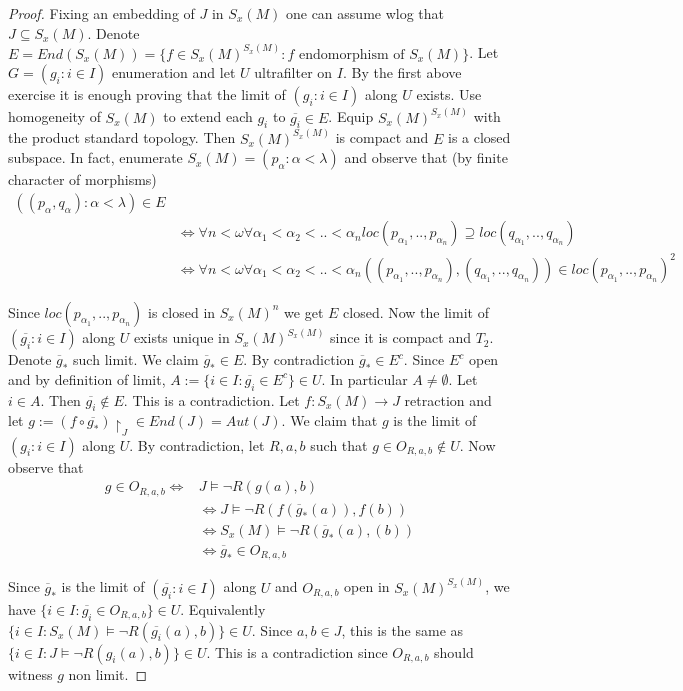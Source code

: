 \documentclass{article}
\begin{document}
\begin{proof}

	Fixing an embedding of $J$ in $S_x(M)$ one can assume wlog that $J \subseteq S_x(M)$.
	Denote $E = End(S_x(M)) = \{f \in S_x(M)^{S_x(M)}: f \text{ endomorphism of } S_x(M) \}$.
	Let $G = (g_i : i \in I)$ enumeration and let $U$ ultrafilter on $I$.
	By the first above exercise it is enough proving that the limit of $(g_i : i \in I)$ along $U$ exists.
	Use homogeneity of $S_x(M)$ to extend each $g_i$ to $\overline{g_i} \in E$.
	Equip $S_x(M) ^{S_x(M)}$ with the product standard topology.
	Then $S_x(M)^{S_x(M)}$ is compact and $E$ is a closed subspace. 
	In fact, enumerate $S_x(M) = (p_{\alpha}: \alpha < \lambda)$ and observe that (by finite character of morphisms)
	\begin{align*}
		((p_{\alpha},q_{\alpha}): \alpha < \lambda) \in E \\ 
		& \iff \forall n < \omega \forall \alpha_1 < \alpha_2 < .. < \alpha_n loc(p_{\alpha_1},..,p_{\alpha_n}) \supseteq loc(q_{\alpha_1},..,q_{\alpha_n}) \\
		& \iff \forall n < \omega \forall \alpha_1 < \alpha_2 < .. < \alpha_n ((p_{\alpha_1},..,p_{\alpha_n}),(q_{\alpha_1},..,q_{\alpha_n})) \in loc(p_{\alpha_1},..,p_{\alpha_n})^2
	\end{align*}

	Since $loc(p_{\alpha_1},..,p_{\alpha_n})$ is closed in $S_x(M)^n$ we get $E$ closed.
	Now the limit of $(\overline{g_i} : i \in I)$ along $U$ exists unique in $S_x(M)^{S_x(M)}$ since it is compact and $T_2$.
	Denote $\overline{g}_*$ such limit. We claim $\overline{g}_* \in E$. By contradiction $\overline{g}_* \in E^c$. Since $E^c$ open and by definition of limit,
	$A:= \{i \in I : \overline{g_i} \in E^c\} \in U$. In particular $A \not = \emptyset $. Let $i \in A$. Then $\overline{g_i} \not \in E$. This is a contradiction.
	Let $f: S_x(M) \to J$ retraction and let $g:= (f \circ \overline{g_*}) \restriction_J \in End(J) = Aut(J)$.
	We claim that $g$ is the limit of $(g_i : i \in I)$ along $U$.
	By contradiction, let $R,a,b$ such that $g \in O_{R,a,b} \not \in U$.
	Now observe that 
	\begin{align*}
		g \in O_{R,a,b} \iff & J \models \neg R(g(a),b) \\
		& \iff J \models \neg R(f(\overline{g}_*(a)),f(b)) \\
		& \iff S_x(M) \models \neg R(\overline{g}_*(a),(b)) \\
		& \iff \overline{g}_* \in O_{R,a,b}
	\end{align*}

	Since $\overline{g}_*$ is the limit of $(\overline{g_i}: i \in I)$ along $U$ and $O_{R,a,b}$ open in $S_x(M)^{S_x(M)}$, we have
	$\{i \in I: \overline{g_i} \in O_{R,a,b}\} \in U$. Equivalently $\{i \in I: S_x(M) \models \neg R(\overline{g_i}(a),b) \} \in U$.
	Since $a,b \in J$, this is the same as $\{i \in I: J \models \neg R(g_i(a),b)\} \in U$.
	This is a contradiction since $O_{R,a,b}$ should witness $g$ non limit.

\end{proof}
\end{document}
